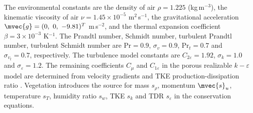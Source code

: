 
The environmental constants are the density of air $\rho=1.225$ (kg\,m$^{-3}$), the kinematic viscosity of air $\nu=1.45\times10^{-5}$ m$^2$\,s$^{-1}$, the gravitational acceleration $\mvec{g}= (0,\ 0,\ -9.81)^T$  m\,s$^{-2}$, and the thermal expansion coefficient $\beta=3\times10^{-3}$ K$^{-1}$. The Prandtl number, Schmidt number, turbulent Prandtl number, turbulent Schmidt number are $\mathrm{Pr}=0.9$, $\sigma_v=0.9$, $\mathrm{Pr}_t=0.7$ and $\sigma_{v_t}=0.7$, respectively. The turbulence model constants are $C_{2\varepsilon}=1.92$, $\sigma_k=1.0$ and $\sigma_{\varepsilon}=1.2$. The remaining coefficients $C_{\mu}$ and $C_{1\varepsilon}$ in the porous realizable $k-\varepsilon$ model are determined from velocity gradients and TKE production-dissipation ratio \citep{Shih1995}. Vegetation introduces the source for mass $s_{\rho}$, momentum $\mvec{s}_u$, temperature $s_T$, humidity ratio $s_w$, TKE $s_k$ and TDR $s_{\varepsilon}$ in the conservation equations.
%
%
